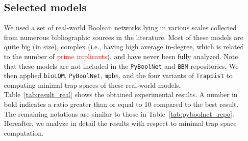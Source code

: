 \documentclass[preprint,12pt]{elsarticle}
\newcommand{\change}[1]{\textcolor{red}{#1}}
\begin{document}
\subsection{Selected models}
\label{subsec:Selected_models}

We used a set of real-world Boolean networks lying in various scales collected from numerous bibliographic sources in the literature.
Most of these models are quite big (in size), complex (i.e., having high average in-degree, which is related to the number of \change{prime implicants}), and have never been fully analyzed.
Note that these models are not included in the \texttt{PyBoolNet} and \texttt{BBM} repositories.
We then applied \texttt{bioLQM}, \texttt{PyBoolNet}, \texttt{mpbn}, and the four variants of \texttt{Trappist} to computing minimal trap spaces of these real-world models.
Table~\ref{tab:result_real} shows the obtained experimental results.
A number in bold indicates a ratio greater than or equal to 10 compared to the best result.
The remaining notations are similar to those in Table~\ref{tab:pyboolnet_repo}.
Hereafter, we analyze in detail the results with respect to minimal trap space computation.
\end{document}
